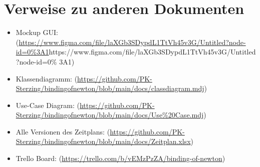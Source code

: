 \documentclass[12pt]{article}
\begin{document}
\section{Verweise zu anderen Dokumenten}
\begin{itemize}
	\item Mockup GUI: \\
(\url{https://www.figma.com/file/laXGb3SDypdL1TtVh45v3G/Untitled?node-id=0\%3A1}{https://www.figma.com/file/laXGb3SDypdL1TtVh45v3G/Untitled?node-id=0$\%$ 3A1})
	\item Klassendiagramm: (\url{https://github.com/PK-Sterzing/bindingofnewton/blob/main/docs/classdiagram.mdj})
	\item Use-Case Diagram: (\url{https://github.com/PK-Sterzing/bindingofnewton/blob/main/docs/Use%20Case.mdj})
	\item Alle Versionen des Zeitplans: (\url{https://github.com/PK-Sterzing/bindingofnewton/blob/main/docs/Zeitplan.xlsx})
	\item Trello Board: (\url{https://trello.com/b/vEMzPzZA/binding-of-newton})
\end{itemize}

\vspace{\baselineskip}
\printbibliography
\end{document}
